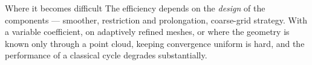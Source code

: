 \begin{block}{Where it becomes difficult}
The efficiency depends on the \emph{design} of the components --- smoother,
restriction and prolongation, coarse-grid strategy. With a \alert{variable
coefficient}, on \alert{adaptively refined meshes}, or where the geometry is
known only through a \alert{point cloud}, keeping convergence uniform is hard,
and the performance of a classical cycle degrades substantially.
\end{block}
